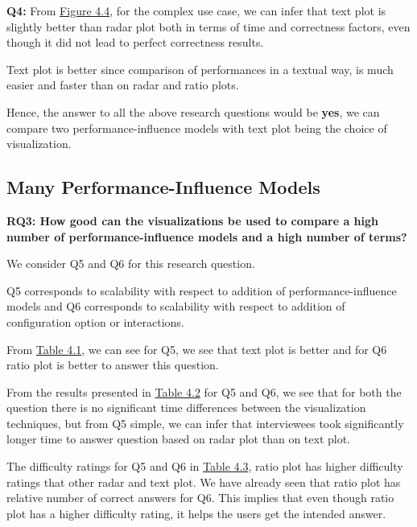 \textbf{Q4:} From \hyperref[figure:paretoTwoQ4]{Figure 4.4}, for the complex use case, we can infer that text plot is slightly better than radar plot both in terms of time and correctness factors, even though it did not lead to perfect correctness results.

Text plot is better since comparison of performances in a textual way, is much easier and faster than on radar and ratio plots.

Hence, the answer to all the above research questions would be \textbf{yes}, we can compare two performance-influence models with text plot being the choice of visualization.

\subsection*{Many Performance-Influence Models}

\vskip 0.2in
\begin{mdframed}
\textbf{RQ3: How good can the visualizations be used to compare a high number of performance-influence models and a high number of terms?}
\end{mdframed}

We consider Q5 and Q6 for this research question.

Q5 corresponds to scalability with respect to addition of performance-influence models and Q6 corresponds to scalability with respect to addition of configuration option or interactions.

\begin{description}[leftmargin=0pt]
\item[Correctness: ]From \hyperref[table:correctness]{Table 4.1}, we can see for Q5, we see that text plot is better and for Q6 ratio plot is better to answer this question.

\item[Time Measurements: ]From the results presented in \hyperref[table:time]{Table 4.2} for Q5 and Q6, we see that for both the question there is no significant time differences between the visualization techniques, but from Q5 simple, we can infer that interviewees took significantly longer time to answer question based on radar plot than on text plot.

\item[Difficulty Ratings: ]The difficulty ratings for Q5 and Q6 in \hyperref[table:rating]{Table 4.3}, ratio plot has higher difficulty ratings that other radar and text plot. We have already seen that ratio plot has relative number of correct answers for Q6. This implies that even though ratio plot has a higher difficulty rating, it helps the users get the intended answer.
\end{description}

